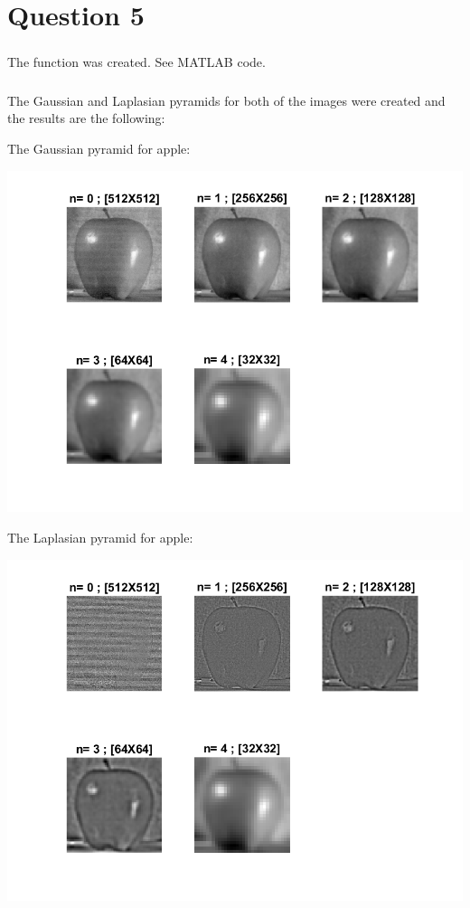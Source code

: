 \documentclass[a4paper]{iacas}
\begin{document}
\newpage
\section{Question 5}

\subsubsection{}
The function was created. See MATLAB code.

\subsubsection{}
The Gaussian and Laplasian pyramids for both of the images were created and the results are the following:

The Gaussian pyramid for apple:
\vskip 0.1in
\begin{minipage}{1\textwidth}
\centering
	\includegraphics[scale=0.9]{../imgs/imgs_q5/q5_apple_gaus.png}
\end{minipage}
\vskip 0.1in

The Laplasian pyramid for apple:
\vskip 0.1in
\begin{minipage}{1\textwidth}
\centering
	\includegraphics[scale=0.9]{../imgs/imgs_q5/q5_apple_lap.png}
\end{minipage}
\vskip 0.1in
\end{document}
